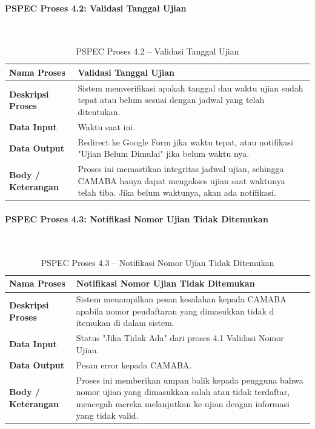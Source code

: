 \paragraph{PSPEC Proses 4.2: Validasi Tanggal Ujian}~\\
\begin{longtable}{|p{}|p{}|}
	\caption{PSPEC Proses 4.2 -- Validasi Tanggal Ujian}
	\label{table:3.pspec42}\\
	\hline
	\textbf{Nama Proses} & Validasi Tanggal Ujian \\
	\hline
	\textbf{Deskripsi Proses} & Sistem memverifikasi apakah tanggal dan waktu ujian sudah tepat atau belum sesuai dengan jadwal yang telah ditentukan. \\
	\hline
	\textbf{Data Input} & Waktu saat ini. \\
	\hline
	\textbf{Data Output} & Redirect ke Google Form jika waktu tepat, atau notifikasi "Ujian Belum Dimulai" jika belum waktu nya. \\
	\hline
	\textbf{Body / Keterangan} & Proses ini memastikan integritas jadwal ujian, sehingga CAMABA hanya dapat mengakses ujian saat waktunya telah tiba. Jika belum waktunya, akan ada notifikasi. \\
	\hline
\end{longtable}


\paragraph{PSPEC Proses 4.3: Notifikasi Nomor Ujian Tidak Ditemukan}~\\
\begin{longtable}{|p{}|p{}|}
	\caption{PSPEC Proses 4.3 -- Notifikasi Nomor Ujian Tidak Ditemukan}
	\label{table:3.pspec43}\\
	\hline
	\textbf{Nama Proses} & Notifikasi Nomor Ujian Tidak Ditemukan \\
	\hline
	\textbf{Deskripsi Proses} & Sistem menampilkan pesan kesalahan kepada CAMABA apabila nomor pendaftaran yang dimasukkan tidak d itemukan di dalam sistem. \\
	\hline
	\textbf{Data Input} & Status "Jika Tidak Ada" dari proses 4.1 Validasi Nomor Ujian. \\
	\hline
	\textbf{Data Output} & Pesan error kepada CAMABA. \\
	\hline
	\textbf{Body / Keterangan} & Proses ini memberikan umpan balik kepada pengguna bahwa nomor ujian yang dimasukkan salah atau tidak terdaftar, mencegah mereka melanjutkan ke ujian dengan informasi yang tidak valid. \\
	\hline
\end{longtable}


